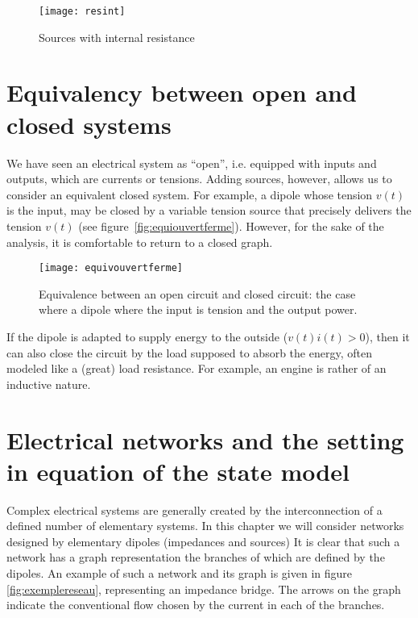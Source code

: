 \begin{figure}[t]
\begin{center}
\texttt{[image: resint]}
\caption{Sources with internal resistance}
\label{fig:resint}
\end{center}
\end{figure}

\section{Equivalency between open and closed systems}

We have seen an electrical system as “open”, i.e. equipped with inputs and outputs, which are currents or tensions.  Adding sources, however, allows us to consider an equivalent closed system.  For example, a dipole whose tension $v(t)$ is the input, may be closed by a variable tension source that precisely delivers the tension $v(t)$ (see figure~\ref{fig:equiouvertferme}).  However, for the sake of the analysis, it is comfortable to return to a closed graph.


\begin{figure}[htbp]
\begin{center}
\texttt{[image: equivouvertferme]}
\caption{Equivalence between an open circuit and closed circuit:  the case where a dipole where the input is tension and the output power.}
\label{fig:equivouvertferme}
\end{center}
\end{figure}

If the dipole is adapted to supply energy to the outside ($v(t) i(t) >0$), then it can also close the circuit by the load supposed to absorb the energy, often modeled like a (great) load resistance.  For example, an engine is rather of an inductive nature.

\section{Electrical networks and the setting in equation of the state model}

Complex electrical systems are generally created by the interconnection of a defined number of elementary systems.  In this chapter we will consider networks designed by elementary dipoles (impedances and sources)  It is clear that such a network has a graph representation the branches of which are defined by the dipoles.  An example of such a network and its graph is given in figure \ref{fig:exemplereseau}, representing an impedance bridge.  The arrows on the graph indicate the conventional flow chosen by the current in each of the branches.  

